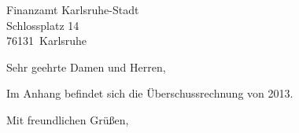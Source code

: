 \documentclass[a4paper, 12pt, KOMAold]{scrlttr2}
\newcommand{\Year}{2013}                                            %
\newcommand{\Empfaenger}{Finanzamt Karlsruhe-Stadt} %
\newcommand{\EStrasse}{Schlossplatz 14}     %
\newcommand{\EPLZ}{76131}                   %
\newcommand{\EOrt}{Karlsruhe}               %
\begin{document}
    \begin{letter}{\Empfaenger \\ \EStrasse \\ \EPLZ~\EOrt}
    \date{\today}%
    \subject{Einnahmenüberschussrechnung \Year}
    \opening{Sehr geehrte Damen und Herren,}

    Im Anhang befindet sich die Überschussrechnung von \Year. 

    \closing{Mit freundlichen Grüßen,}
    \end{letter}

    
\end{document}

